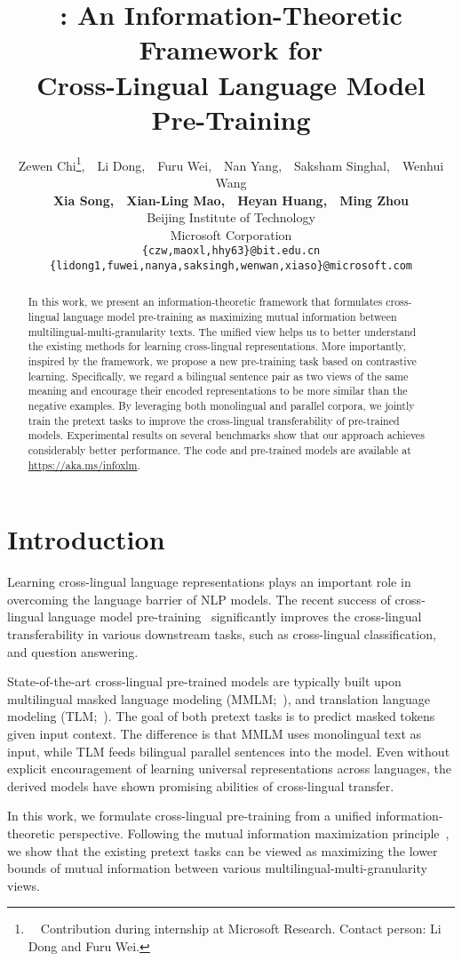 \documentclass[11pt,a4paper]{article}
\title{\our{}: An Information-Theoretic Framework for \\ Cross-Lingual Language Model Pre-Training}
\author{Zewen Chi\thanks{\ \  Contribution during internship at Microsoft Research. Contact person: Li Dong and Furu Wei.
},~~Li Dong,~~Furu Wei,~~Nan Yang,~~Saksham Singhal,~~Wenhui Wang\\
\textbf{Xia Song}\textbf{,}~~\textbf{Xian-Ling Mao}\textbf{,}~~\textbf{Heyan Huang}\textbf{,}~~\textbf{Ming Zhou}\\
Beijing Institute of Technology \\
Microsoft Corporation \\
\texttt{\{czw,maoxl,hhy63\}@bit.edu.cn}
\\\texttt{\{lidong1,fuwei,nanya,saksingh,wenwan,xiaso\}@microsoft.com} \\}
\date{}
\begin{document}
\maketitle
\begin{abstract}
In this work, we present an information-theoretic framework that formulates cross-lingual language model pre-training as maximizing mutual information between multilingual-multi-granularity texts. The unified view helps us to better understand the existing methods for learning cross-lingual representations. More importantly, inspired by the framework, we propose a new pre-training task based on contrastive learning. Specifically, we regard a bilingual sentence pair as two views of the same meaning and encourage their encoded representations to be more similar than the negative examples. By leveraging both monolingual and parallel corpora, we jointly train the pretext tasks to improve the cross-lingual transferability of pre-trained models. Experimental results on several benchmarks show that our approach achieves considerably better performance. The code and pre-trained models are available at \url{https://aka.ms/infoxlm}.
\end{abstract}


\section{Introduction}
\label{sec:intro}

Learning cross-lingual language representations plays an important role in overcoming the language barrier of NLP models.
The recent success of cross-lingual language model pre-training~\cite{bert,xlm,xlmr,xnlg,mbart} significantly improves the cross-lingual transferability in various downstream tasks, such as cross-lingual classification, and question answering.

State-of-the-art cross-lingual pre-trained models are typically built upon multilingual masked language modeling (MMLM;~\citealt{bert,xlmr}), and translation language modeling (TLM;~\citealt{xlm}).
The goal of both pretext tasks is to predict masked tokens given input context. The difference is that MMLM uses monolingual text as input, while TLM feeds bilingual parallel sentences into the model.
Even without explicit encouragement of learning universal representations across languages, the derived models have shown promising abilities of cross-lingual transfer.

In this work, we formulate cross-lingual pre-training from a unified information-theoretic perspective.
Following the mutual information maximization principle~\cite{infomax,infoword}, we show that the existing pretext tasks can be viewed as maximizing the lower bounds of mutual information between various multilingual-multi-granularity views.
\end{document}
